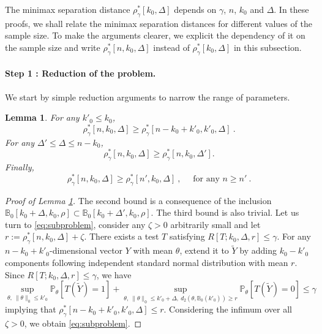 \documentclass[twoside,11pt]{article}
\newtheorem{lem}{Lemma}
\def\beq{\begin{equation}}
\def\eeq{\end{equation}}
\def\bbB{\mathbb{B}}
\newcommand{\<}{\langle}
\renewcommand{\>}{\rangle}
\begin{document}
The minimax separation distance $\rho^*_{\gamma}[k_0,\Delta]$ depends on $\gamma$, $n$, $k_0$ and $\Delta$. In these proofs, we shall relate the minimax separation distances for different values of the sample size. To make the arguments clearer, we explicit the dependency of it on the sample size and write $\rho^*_{\gamma}[n,k_0,\Delta]$ instead of $\rho^*_{\gamma}[k_0,\Delta]$ in this subsection. 




\paragraph{Step 1 : Reduction of the problem.}

We start by simple reduction arguments to narrow the range of parameters.


\begin{lem}\label{lem:reduction}
For any $ k'_0\leq k_0$,
 \beq\label{eq:subproblem}
 \rho_{\gamma}^{*}[n,k_0,\Delta] \geq \rho_{\gamma}^{*}[n-k_0+k'_0,k'_0,\Delta]\ .
 \eeq
For any $ \Delta'\leq \Delta\leq n-k_0$, 
 \beq\label{eq:monotonic}
  \rho_{\gamma}^{*}[n,k_0,\Delta]\geq \rho_{\gamma}^{*}[n,k_0,\Delta'].
 \eeq
 Finally, 
 \beq\label{eq:reduction_sample}
 \rho_{\gamma}^{*}[n,k_0,\Delta]\geq \rho_{\gamma}^{*}[n',k_0,\Delta]\ ,\quad  \text{ for any }n\geq n'\ .
 \eeq
\end{lem}
\begin{proof}[Proof of Lemma \ref{lem:reduction}]
The second bound is a  consequence of the inclusion $\bbB_{0}[k_0+\Delta, k_0,\rho]\subset \bbB_{0}[k_0+\Delta', k_0,\rho]$. The third bound is also trivial. Let us turn to \eqref{eq:subproblem}, consider any $\zeta>0$ arbitrarily small and let $r:= \rho_{\gamma}^{*}[n,k_0,\Delta]+\zeta$. There exists a test $T$ satisfying $R[T;k_0,\Delta,r]\leq \gamma$. For any $n-k_0+k'_0$-dimensional vector $Y$ with mean $\theta$, extend it to $\tilde{Y}$ by adding $k_0-k'_0$ components following independent standard normal distribution with mean $r$. Since $R[T;k_0,\Delta,r]\leq \gamma$, we have
\[\sup_{\theta,\ \|\theta\|_0\leq k'_0} \mathbb P_{\theta}[T(\tilde{Y})=1]+ \sup_{\theta,\ \|\theta\|_0\leq k'_0+ \Delta,\ d_2(\theta,\bbB_0(k'_0))\geq r}\mathbb P_{\theta}[T(\tilde{Y})=0]\leq \gamma\]
implying that $\rho_{\gamma}^{*}[n-k_0+k'_0,k'_0,\Delta]\leq r$. Considering the infimum over all $\zeta>0$, we obtain \eqref{eq:subproblem}.
\end{proof}
\end{document}
